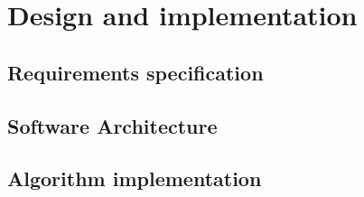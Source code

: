 \chapter{Design and implementation}

\section{Requirements specification}

\section{Software Architecture}

\section{Algorithm implementation}
